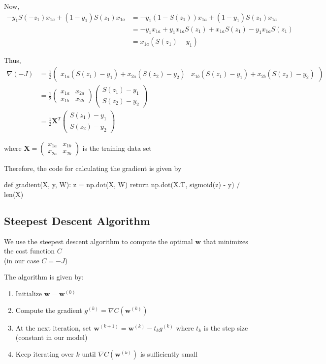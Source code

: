 \documentclass[journal,12pt,onecolumn]{IEEEtran}
\let\vec\mathbf
\newcommand{\myvec}[1]{\ensuremath{\begin{pmatrix}#1\end{pmatrix}}}
\begin{document}
	Now,
	\begin{align}
		-y_1 S(-z_1) x_{1a} + (1 - y_1) S(z_1) x_{1a} &= -y_1 (1 - S(z_1)) x_{1a} + (1 - y_1) S(z_1) x_{1a} \\		
		&= -y_1x_{1a} + y_1x_{1a}S(z_1) + x_{1a}S(z_1) - y_1x_{1a}S(z_1) \\
		&= x_{1a} (S(z_1) - y_1)
	\end{align}
	
	Thus,
	\begin{align}
		\nabla (-J) &= \frac{1}{2} \myvec{x_{1a} (S(z_1) - y_1) + x_{2a} (S(z_2) - y_2) & x_{1b} (S(z_1) - y_1) + x_{2b} (S(z_2) - y_2)} \\
		&= \frac{1}{2} \myvec{x_{1a} & x_{2a} \\ x_{1b} & x_{2b}} \myvec{S(z_1) - y_1 \\ S(z_2) - y_2} \\
		&= \frac{1}{2} \vec{X}^T \myvec{S(z_1) - y_1 \\ S(z_2) - y_2}
	\end{align}
	
	where $\vec{X} = \myvec{x_{1a} & x_{1b} \\ x_{2a} & x_{2b}}$ is the training data set
	
	\vspace*{10pt}
	Therefore, the code for calculating the gradient is given by
	\begin{python}
	def gradient(X, y, W):
    		z = np.dot(X, W)
    		return np.dot(X.T, sigmoid(z) - y) / len(X) \end{python}
	
	\pagebreak
	
	\subsection*{Steepest Descent Algorithm}
	We use the steepest descent algorithm to compute the optimal $\vec{w}$ that minimizes the cost function $C$ \\(in our case $C = -J$) 	
	
	The algorithm is given by:
	\begin{enumerate}
		\item Initialize $\vec{w} = \vec{w}^{(0)}$
		\item Compute the gradient $g^{(k)} = \nabla C(\vec{w}^{(k)})$
		\item At the next iteration, set $\vec{w}^{(k+1)} = \vec{w}^{(k)} - t_k g^{(k)}$ where $t_k$ is the step size (constant in our model)
		\item Keep iterating over $k$ until $\nabla C(\vec{w}^{(k)})$ is sufficiently small 	
	\end{enumerate}
	
\end{document}
